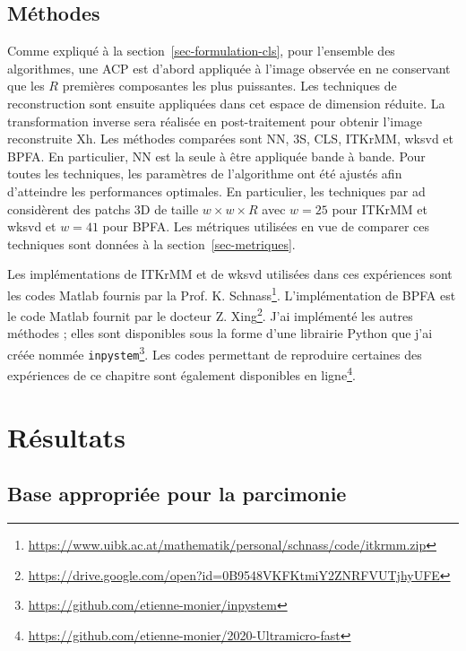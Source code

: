 \subsection{Méthodes}

Comme expliqué à la section~\ref{sec-formulation-cls}, pour l'ensemble des algorithmes, une ACP est d'abord appliquée à l'image observée en ne conservant que les $R$ premières composantes les plus puissantes. Les techniques de reconstruction sont ensuite appliquées dans cet espace de dimension réduite. La transformation inverse sera réalisée en post-traitement pour obtenir l'image reconstruite \gls{Xh}. Les méthodes comparées sont NN, 3S, CLS, ITKrMM, \gls{wksvd} et BPFA. En particulier, NN est la seule à être appliquée bande à bande. Pour toutes les techniques, les paramètres de l'algorithme ont été ajustés afin d'atteindre les performances optimales. En particulier, les techniques par \gls{ad} considèrent des patchs 3D de taille $w\times w \times R$ avec $w=25$ pour ITKrMM et \gls{wksvd} et $w=41$ pour BPFA. Les métriques utilisées en vue de comparer ces techniques sont données à la section~\ref{sec-metriques}.

Les implémentations de ITKrMM et de \gls{wksvd} utilisées dans ces expériences sont les codes Matlab fournis par la Prof. K. Schnass\footnote{\url{https://www.uibk.ac.at/mathematik/personal/schnass/code/itkrmm.zip}}. L'implémentation de BPFA est le code Matlab fournit par le docteur Z. Xing\footnote{\url{https://drive.google.com/open?id=0B9548VKFKtmiY2ZNRFVUTjhyUFE}}. J'ai implémenté les autres méthodes ;  elles sont disponibles sous la forme d'une librairie Python que j'ai créée nommée \texttt{inpystem}\footnote{\url{https://github.com/etienne-monier/inpystem}}. Les codes permettant de reproduire certaines des expériences de ce chapitre sont également disponibles en ligne\footnote{\url{https://github.com/etienne-monier/2020-Ultramicro-fast}}.



%
\section{Résultats}\label{sec-hr-results}

\subsection{Base appropriée pour la parcimonie}\label{sec-appropriate-basis}

